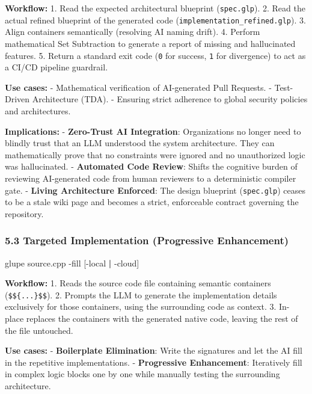 \documentclass[11pt, a4paper]{article}
\newenvironment{Shaded}{\begin{snugshade}}{\end{snugshade}}
\newcommand{\AttributeTok}[1]{\textcolor[rgb]{0.77,0.63,0.00}{#1}}
\newcommand{\ExtensionTok}[1]{#1}
\newcommand{\KeywordTok}[1]{\textcolor[rgb]{0.13,0.29,0.53}{\textbf{#1}}}
\newcommand{\NormalTok}[1]{#1}
\begin{document}
\textbf{Workflow:} 1. Read the expected architectural blueprint
(\texttt{spec.glp}). 2. Read the actual refined blueprint of the
generated code (\texttt{implementation\_refined.glp}). 3. Align
containers semantically (resolving AI naming drift). 4. Perform
mathematical Set Subtraction to generate a report of missing and
hallucinated features. 5. Return a standard exit code (\texttt{0} for
success, \texttt{1} for divergence) to act as a CI/CD pipeline
guardrail.

\textbf{Use cases:} - Mathematical verification of AI-generated Pull
Requests. - Test-Driven Architecture (TDA). - Ensuring strict adherence
to global security policies and architectures.

\textbf{Implications:} - \textbf{Zero-Trust AI Integration}:
Organizations no longer need to blindly trust that an LLM understood the
system architecture. They can mathematically prove that no constraints
were ignored and no unauthorized logic was hallucinated. -
\textbf{Automated Code Review}: Shifts the cognitive burden of reviewing
AI-generated code from human reviewers to a deterministic compiler gate.
- \textbf{Living Architecture Enforced}: The design blueprint
(\texttt{spec.glp}) ceases to be a stale wiki page and becomes a strict,
enforceable contract governing the repository.

\subsubsection{5.3 Targeted Implementation (Progressive
Enhancement)}\label{targeted-implementation-progressive-enhancement}

\begin{Shaded}
\begin{Highlighting}[]
\ExtensionTok{glupe}\NormalTok{ source.cpp }\AttributeTok{{-}fill}\NormalTok{ [{-}local }\KeywordTok{|} \ExtensionTok{{-}cloud]}
\end{Highlighting}
\end{Shaded}

\textbf{Workflow:} 1. Reads the source code file containing semantic
containers (\texttt{\$\$\{...\}\$\$}). 2. Prompts the LLM to generate
the implementation details exclusively for those containers, using the
surrounding code as context. 3. In-place replaces the containers with
the generated native code, leaving the rest of the file untouched.

\textbf{Use cases:} - \textbf{Boilerplate Elimination}: Write the
signatures and let the AI fill in the repetitive implementations. -
\textbf{Progressive Enhancement}: Iteratively fill in complex logic
blocks one by one while manually testing the surrounding architecture.
\end{document}
